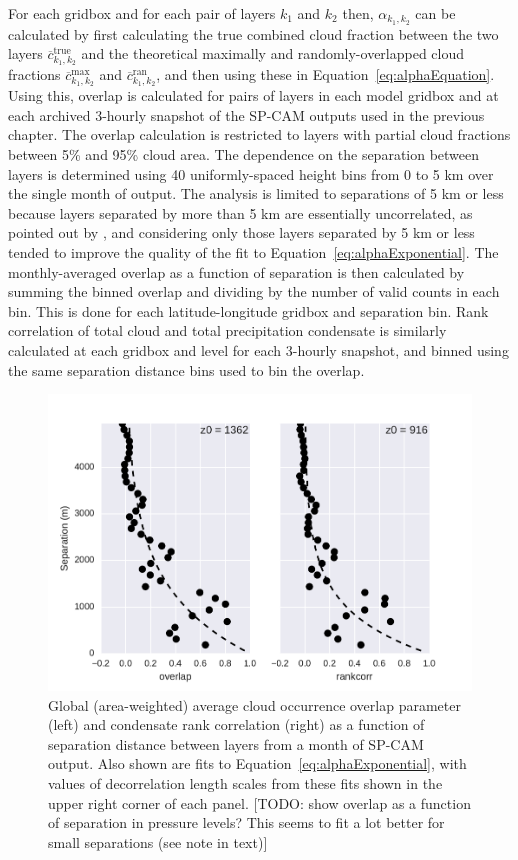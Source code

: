 For each gridbox and for each pair of layers \(k_1\) and \(k_2\) then,
\(\alpha_{k_1, k_2}\) can be calculated by first calculating the true
combined cloud fraction between the two layers
\(\overline{c}^\textrm{true}_{k_1, k_2}\) and the theoretical maximally
and randomly-overlapped cloud fractions
\(\overline{c}^\textrm{max}_{k_1, k_2}\) and
\(\overline{c}^\textrm{ran}_{k_1, k_2}\), and then using these in
Equation~\ref{eq:alphaEquation}. Using this, overlap is calculated for
pairs of layers in each model gridbox and at each archived 3-hourly
snapshot of the SP-CAM outputs used in the previous chapter. The overlap
calculation is restricted to layers with partial cloud fractions between
5\% and 95\% cloud area. The dependence on the separation between layers
is determined using 40 uniformly-spaced height bins from 0 to 5 km over
the single month of output. The analysis is limited to separations of 5
km or less because layers separated by more than 5 km are essentially
uncorrelated, as pointed out by \citet{pincus_et_al_2005}, and
considering only those layers separated by 5 km or less tended to
improve the quality of the fit to Equation~\ref{eq:alphaExponential}.
The monthly-averaged overlap as a function of separation is then
calculated by summing the binned overlap and dividing by the number of
valid counts in each bin. This is done for each latitude-longitude
gridbox and separation bin. Rank correlation of total cloud and total
precipitation condensate is similarly calculated at each gridbox and
level for each 3-hourly snapshot, and binned using the same separation
distance bins used to bin the overlap.

\begin{figure}[htbp]
\centering
\includegraphics{graphics/subgrid2_overlap_dz.pdf}
\caption{\label{fig:overlapScatter}Global (area-weighted) average cloud
occurrence overlap parameter (left) and condensate rank correlation
(right) as a function of separation distance between layers from a month
of SP-CAM output. Also shown are fits to
Equation~\ref{eq:alphaExponential}, with values of decorrelation length
scales from these fits shown in the upper right corner of each panel.
{[}TODO: show overlap as a function of separation in pressure levels?
This seems to fit a lot better for small separations (see note in
text){]}}\label{fig:overlapScatter}
\end{figure}

